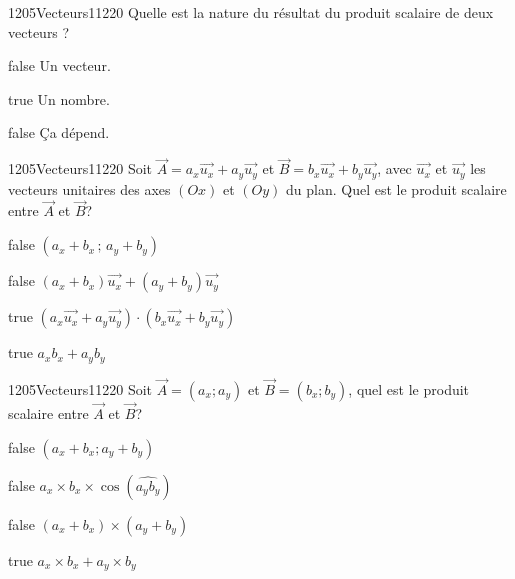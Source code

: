            \begin{question}{1205}{Vecteurs}{1}{1220}
				Quelle est la nature du résultat du produit scalaire de deux vecteurs ?
            \end{question}
            \begin{reponses}
            	\item[false] Un vecteur.
            	\item[true] Un nombre.
            	\item[false] Ça dépend.
            \end{reponses}
            \begin{question}{1205}{Vecteurs}{1}{1220}
				Soit $\vec{A}=a_x\vec{u_x}+a_y\vec{u_y}$ et $\vec{B}=b_x\vec{u_x}+b_y\vec{u_y}$, avec $\vec{u_x}$ et $\vec{u_y}$ les vecteurs unitaires des axes $(Ox)$ et $(Oy)$ du plan. Quel est le produit scalaire entre $\vec{A}$ et $\vec{B}$?
            \end{question}
            \begin{reponses}
            	\item[false] $(a_x+b_x\,;\,a_y+b_y)$
            	\item[false] $(a_x+b_x )\vec{u_x}+(a_y+b_y)\vec{u_y}$
                \item[true] $(a_x\vec{u_x}+a_y\vec{u_y})\cdot(b_x\vec{u_x}+b_y\vec{u_y})$
                \item[true] $a_x b_x+a_y b_y$
            \end{reponses}
        	\begin{question}{1205}{Vecteurs}{1}{1220}
				Soit $\vec{A}=(a_x;a_y)$ et $\vec{B}=(b_x;b_y)$, quel est le produit scalaire entre $\vec{A}$ et $\vec{B}$?
            \end{question}
            \begin{reponses}
            	\item[false] $(a_x+b_x;a_y+b_y)$
            	\item[false] $a_x\times b_x\times \cos(\widehat{a_y b_y})$
                \item[false] $(a_x+b_x)\times (a_y+b_y)$
                \item[true] $a_x\times b_x+a_y\times b_y$
            \end{reponses}
